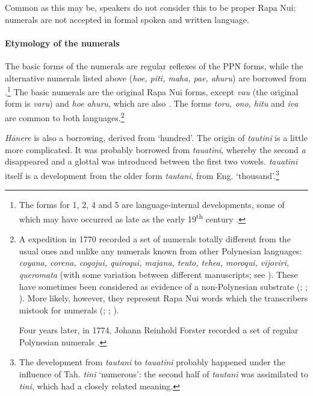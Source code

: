 Common as this may be, speakers do not consider this to be proper Rapa Nui;  numerals are not accepted in formal spoken and written language.

\paragraph{Etymology of the numerals} The basic forms of the numerals are regular reflexes of the PPN forms, while the alternative numerals listed above (\textit{\mbox{ho{\ꞌ}e}}\textit{, piti}\textit{, maha}\textit{, pae}\textit{, {\ꞌ}ahuru}) are borrowed from .\footnote{\label{fn:168}The  forms for 1, 2, 4 and 5 are language-internal developments, some of which may have occurred as late as the early 19\textsuperscript{th} century \citep[64]{White1968}.} The basic numerals are the original Rapa Nui forms, except \textit{va{\ꞌ}u} (the original form is \textit{varu}) and \textit{ho{\ꞌ}e \mbox{{\ꞌ}ahuru}}, which are also . The forms \textit{toru, ono, hitu} and \textit{iva} are common to both languages.\footnote{\label{fn:169}A  expedition in 1770 recorded a set of numerals totally different from the usual ones and unlike any numerals known from other Polynesian languages: \textit{coyana, corena, cogojui, quiroqui, majana, teuto, tehea, moroqui, vijoviri, queromata} (with some variation between different manuscripts; see \citealt{Ross1937}). These have sometimes been considered as evidence of a non-Polynesian substrate (\citealt{Ross1936}; \citealt{Schuhmacher1976,Schuhmacher1990}; \citealt{MangorSchuhmacher1998}). More likely, however, they represent Rapa Nui words which the  transcribers mistook for numerals (\citealt{Fischer1992}; \citealt{Fedorova1993}; \citealt{MellénBlanco1994}).

Four years later, in 1774, Johann Reinhold Forster recorded a set of regular Polynesian numerals \citep[184]{Fischer1992}.}

\textit{Hānere} is also a  borrowing, derived from  ‘hundred’. The origin of \textit{ta{\ꞌ}utini} is a little more complicated. It was probably borrowed from  \textit{tauatini}, whereby the second \textit{a} disappeared and a glottal was introduced between the first two vowels.  \textit{tauatini} itself is a development from the older form \textit{tautani}, from Eng. ‘thousand’.\footnote{\label{fn:170}The development from \textit{tautani} to \textit{tauatini} probably happened under the influence of Tah. \textit{tini} ‘numerous’: the second half of \textit{tautani} was assimilated to \textit{tini}, which had a closely related meaning.}

